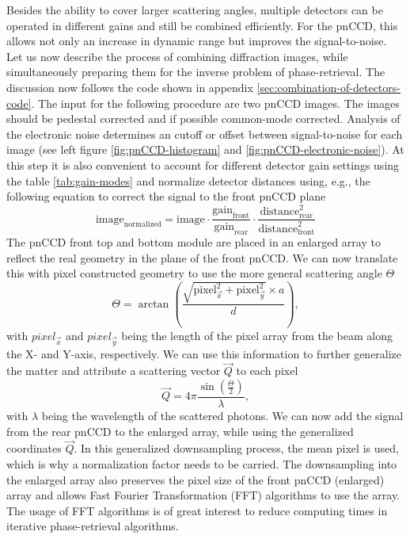 Besides the ability to cover larger scattering angles, multiple detectors can be operated in different gains and still be combined efficiently. For the pnCCD, this allows not only an increase in dynamic range but improves the signal-to-noise.\\
Let us now describe the process of combining diffraction images, while simultaneously preparing them for the inverse problem of phase-retrieval. The discussion now follows the code shown in appendix \ref{sec:combination-of-detectors-code}. The input for the following procedure are two pnCCD images. The images should be pedestal corrected and if possible common-mode corrected. Analysis of the electronic noise determines an cutoff or offset between signal-to-noise for each image (see left figure \ref{fig:pnCCD-histogram} and \ref{fig:pnCCD-electronic-noise}). At this step it is also convenient to account for different detector gain settings using the table \ref{tab:gain-modes} and normalize detector distances using, e.g., the following equation to correct the signal to the front pnCCD plane
\begin{equation}
\text{image}_{\text{normalized}} = \text{image}\cdot \frac{\text{gain}_{\text{front}}}{\text{gain}_{\text{rear}}} \cdot \frac{\text{distance}_{\text{rear}}^{2}}{\text{distance}_{\text{front}}^{2}}
\end{equation}
The pnCCD front top and bottom module are placed in an enlarged array to reflect the real geometry in the plane of the front pnCCD. We can now translate this with pixel constructed geometry to use the more general scattering angle $\Theta$
\begin{equation}
\Theta = \arctan\left(\frac{\sqrt{\text{pixel}_{\vec{x}}^{2}+\text{pixel}_{\vec{y}}^{2}}\times a}{d}\right),
\label{eqn:scattering-angle}
\end{equation}
with $pixel_{\vec{x}}$ and $pixel_{\vec{y}}$ being the length of the pixel array from the beam along the X- and Y-axis, respectively. We can use this information to further generalize the matter and attribute a scattering vector $\vec{Q}$ to each pixel
\begin{equation}
\vec{Q} = 4 \pi \frac{\sin\left(\frac{\Theta}{2}\right)}{\lambda},
\label{eqn:q-vector}
\end{equation}
with $\lambda$ being the wavelength of the scattered photons. We can now add the signal from the rear pnCCD to the enlarged array, while using the generalized coordinates $\vec{Q}$. In this generalized downsampling process, the mean pixel is used, which is why a normalization factor needs to be carried. The downsampling into the enlarged array also  preserves the pixel size of the front pnCCD (enlarged) array and allows Fast Fourier Transformation (FFT) algorithms to use the array. The usage of FFT algorithms is of great interest to reduce computing times in iterative phase-retrieval algorithms.\\
